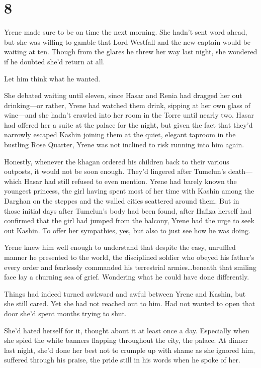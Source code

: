 
\chapter{8}

Yrene made sure to be on time the next morning.
She hadn't sent word ahead, but she was willing to gamble that Lord Westfall and the new captain would be waiting at ten.
Though from the glares he threw her way last night, she wondered if he doubted she'd return at all.

Let him think what he wanted.

She debated waiting until eleven, since Hasar and Renia had dragged her out drinking---or rather, Yrene had watched them drink, sipping at her own glass of wine---and she hadn't crawled into her room in the Torre until nearly two.
Hasar had offered her a suite at the palace for the night, but given the fact that they'd narrowly escaped Kashin joining them at the quiet, elegant taproom in the bustling Rose Quarter, Yrene was not inclined to risk running into him again.

Honestly, whenever the khagan ordered his children back to their various outposts, it would not be soon enough.
They'd lingered after Tumelun's death--- which Hasar had still refused to even mention.
Yrene had barely known the youngest princess, the girl having spent most of her time with Kashin among the Darghan on the steppes and the walled cities scattered around them.
But in those initial days after Tumelun's body had been found, after Hafiza herself had confirmed that the girl had jumped from the balcony, Yrene had the urge to seek out Kashin.
To offer her sympathies, yes, but also to just see how he was doing.

Yrene knew him well enough to understand that despite the easy, unruffled manner he presented to the world, the disciplined soldier who obeyed his father's every order and fearlessly commanded his terrestrial armies\ldots beneath that smiling face lay a churning sea of grief.
Wondering what he could have done differently.

Things had indeed turned awkward and awful between Yrene and Kashin, but  she still cared.
Yet she had not reached out to him.
Had not wanted to open that door she'd spent months trying to shut.

She'd hated herself for it, thought about it at least once a day.
Especially when she spied the white banners flapping throughout the city, the palace.
At dinner last night, she'd done her best not to crumple up with shame as she ignored him, suffered through his praise, the pride still in his words when he spoke of her.

